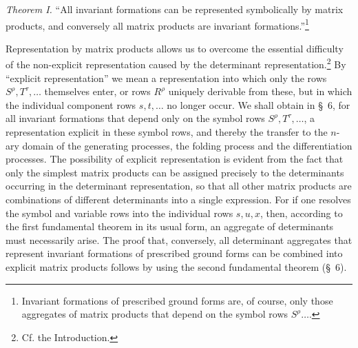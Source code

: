 \documentclass[11pt]{article}
\begin{document}
\emph{Theorem I.} ``All invariant formations can be represented symbolically by matrix products, and conversely all matrix products are invariant formations.''\footnote{Invariant formations of prescribed ground forms are, of course, only those aggregates of matrix products that depend on the symbol rows $S^\rho\ldots$.}

Representation by matrix products allows us to overcome the essential difficulty of the non-explicit representation caused by the determinant representation.\footnote{Cf. the Introduction.} By ``explicit representation'' we mean a representation into which only the rows $S^\rho,T^\tau,\ldots$ themselves enter, or rows $R^\rho$ uniquely derivable from these, but in which the individual component rows $s,t,\ldots$ no longer occur. We shall obtain in \S\ 6, for all invariant formations that depend only on the symbol rows $S^\rho,T^\tau,\ldots$, a representation explicit in these symbol rows, and thereby the transfer to the $n$-ary domain of the generating processes, the folding process and the differentiation processes. The possibility of explicit representation is evident from the fact that only the simplest matrix products can be assigned precisely to the determinants occurring in the determinant representation, so that all other matrix products are combinations of different determinants into a single expression. For if one resolves the symbol and variable rows into the individual rows $s,u,x$, then, according to the first fundamental theorem in its usual form, an aggregate of determinants must necessarily arise. The proof that, conversely, all determinant aggregates that represent invariant formations of prescribed ground forms can be combined into explicit matrix products follows by using the second fundamental theorem (\S\ 6).
\end{document}
